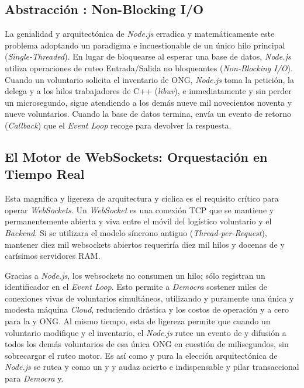 \subsection{Abstracción : Non-Blocking I/O}

La genialidad y arquitectónica de \textit{Node.js} erradica y matemáticamente este problema adoptando un paradigma e incuestionable de un único hilo principal (\textit{Single-Threaded}). En lugar de bloquearse al esperar una base de datos, \textit{Node.js} utiliza operaciones de ruteo Entrada/Salida no bloqueantes (\textit{Non-Blocking I/O}). Cuando un voluntario solicita el inventario de ONG, \textit{Node.js} toma la petición, la delega y a los hilos trabajadores de C++ (\textit{libuv}), e inmediatamente y sin perder un microsegundo, sigue atendiendo a los demás nueve mil novecientos noventa y nueve voluntarios. Cuando la base de datos termina, envía un evento de retorno (\textit{Callback}) que el \textit{Event Loop} recoge para devolver la respuesta.

\subsection{El Motor de WebSockets: Orquestación en Tiempo Real}

Esta magnífica y ligereza de arquitectura y cíclica es el requisito crítico para operar \textit{WebSockets}. Un \textit{WebSocket} es una conexión TCP que se mantiene y permanentemente abierta y viva entre el móvil del logístico voluntario y el \textit{Backend}. Si se utilizara el modelo síncrono antiguo (\textit{Thread-per-Request}), mantener diez mil websockets abiertos requeriría diez mil hilos y docenas de y carísimos servidores RAM.

Gracias a \textit{Node.js}, los websockets no consumen un hilo; sólo registran un identificador en el \textit{Event Loop}. Esto permite a \textit{Democra} sostener miles de conexiones vivas de voluntarios simultáneos, utilizando y puramente una única y modesta máquina \textit{Cloud}, reduciendo drástica y los costos de operación y a cero para la y ONG. Al mismo tiempo, esta de ligereza permite que cuando un voluntario modifique y el inventario, el \textit{Node.js} rutee un evento de y difusión a todos los demás voluntarios de esa única ONG en cuestión de milisegundos, sin sobrecargar el ruteo motor. Es así como y pura la elección arquitectónica de \textit{Node.js} se rutea y como un y y audaz acierto e indispensable y pilar transaccional para \textit{Democra} y.
